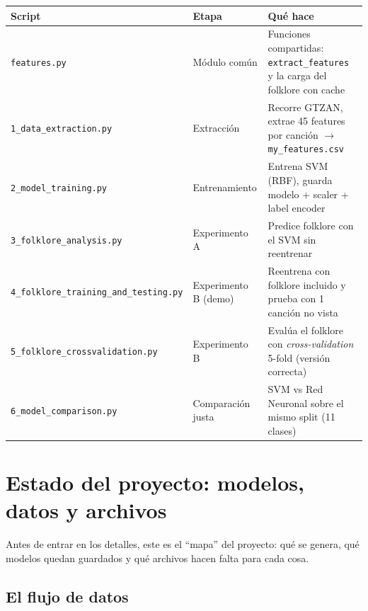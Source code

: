 \documentclass[11pt,a4paper]{article}
\begin{document}
\begingroup\footnotesize\renewcommand{\_}{\textunderscore\allowbreak}
\begin{longtable}{p{3.6cm} p{3.3cm} p{6cm}}
\toprule
\textbf{Script} & \textbf{Etapa} & \textbf{Qué hace} \\
\midrule
\texttt{features.py} & Módulo común & Funciones compartidas: \texttt{extract\_features} y la carga del folklore con cache \\
\texttt{1\_data\_extraction.py} & Extracción & Recorre GTZAN, extrae 45 features por canción $\rightarrow$ \texttt{my\_features.csv} \\
\texttt{2\_model\_training.py} & Entrenamiento & Entrena SVM (RBF), guarda modelo + scaler + label encoder \\
\texttt{3\_folklore\_analysis.py} & Experimento A & Predice folklore con el SVM sin reentrenar \\
\texttt{4\_folklore\_training\_and\_testing.py} & Experimento B (demo) & Reentrena con folklore incluido y prueba con 1 canción no vista \\
\texttt{5\_folklore\_crossvalidation.py} & Experimento B & Evalúa el folklore con \emph{cross-validation} 5-fold (versión correcta) \\
\texttt{6\_model\_comparison.py} & Comparación justa & SVM vs Red Neuronal sobre el mismo split (11 clases) \\
\bottomrule
\end{longtable}
\endgroup

\section{Estado del proyecto: modelos, datos y archivos}

Antes de entrar en los detalles, este es el ``mapa'' del proyecto: qué se genera,
qué modelos quedan guardados y qué archivos hacen falta para cada cosa.

\subsection{El flujo de datos}
\end{document}
